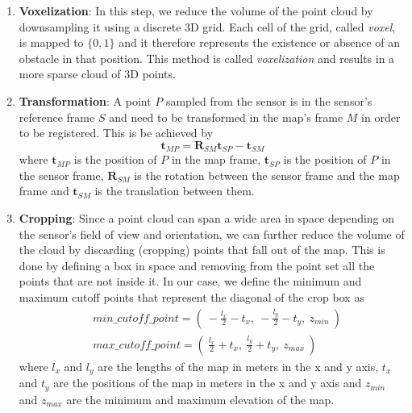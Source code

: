 \begin{enumerate}
    \item \textbf{Voxelization}:
        In this step, we reduce the volume of the point cloud by downsampling
        it using a discrete 3D grid.
        Each cell of the grid, called \textit{voxel}, is mapped to $\{0,1\}$
        and it therefore represents the existence or absence of an obstacle
        in that position.
        This method is called \textit{voxelization} and results in a more
        sparse cloud of 3D points.


    \item \textbf{Transformation}:
        A point $P$ sampled from the sensor is in the sensor's reference frame
        $S$ and need to be transformed in the map's frame $M$ in order to be
        registered.
        This is be achieved by
        \begin{equation}
            \mathbf{t}_{MP} =
                \mathbf{R}_{SM} \mathbf{t}_{SP} -
                \mathbf{t}_{SM}
        \end{equation}
        where
        $\mathbf{t}_{MP}$ is the position of $P$ in the map frame,
        $\mathbf{t}_{SP}$ is the position of $P$ in the sensor frame,
        $\mathbf{R}_{SM}$ is the rotation between the sensor frame and the
        map frame and
        $\mathbf{t}_{SM}$ is the translation between them.

    \item \textbf{Cropping}:
        Since a point cloud can span a wide area in space depending on the
        sensor's field of view and orientation, we can further reduce the
        volume of the cloud by discarding (cropping) points that fall out
        of the map.
        This is done by defining a box in space and removing
        from the point set all the points that are not inside it.
        In our case, we define the minimum and maximum cutoff points that
        represent the diagonal of the crop box as
        \begin{equation}
        \begin{aligned}
            &min\_cutoff\_point =
                \left( \
                    - \frac{l_x}{2} - t_x, \
                    - \frac{l_y}{2} - t_y, \
                    z_{min} \
                \right) \\
            &max\_cutoff\_point =
                \left( \
                    \frac{l_x}{2} + t_x, \
                    \frac{l_y}{2} + t_y, \
                    z_{max} \
                \right)
        \end{aligned}
        \end{equation}
        where
        $l_x$ and $l_y$ are the lengths of the map in meters in the
        x and y axis,
        $t_x$ and $t_y$ are the positions of the map in meters in the
        x and y axis and
        $z_{min}$ and $z_{max}$ are the minimum and maximum elevation
        of the map.


\end{enumerate}
